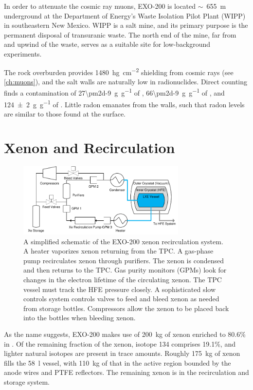 \documentclass[herrin-thesis.tex]{subfiles}
\begin{document}
In order to attenuate the cosmic ray muons, EXO-200 is located \(\sim\)~\SI{655}{\m} underground at the Department of Energy's Waste Isolation Pilot Plant (WIPP) in southeastern New Mexico. WIPP is a salt mine, and its primary purpose is the permanent disposal of transuranic waste. The north end of the mine, far from and upwind of the waste, serves as a suitable site for low-background experiments.

The rock overburden provides \SI{1480}{\hecto\g\per\square\cm} shielding from cosmic rays (see \cref{ch:muons}), and the salt walls are naturally low in radionuclides. Direct counting finds a contamination of \SI[per-mode=symbol]{27\pm2d-9}{\g\per\g} of , \SI[per-mode=symbol]{66\pm2d-9}{\g\per\g} of , and \SI[per-mode=symbol]{124\pm2}{\g\per\g} of \cite{Auger:2012dq}. Little radon emanates from the walls, such that radon levels are similar to those found at the surface.

\section{Xenon and Recirculation}

\begin{figure}
\centering
\includegraphics[width=0.75\textwidth]{./figures/detector_simplified_xe.pdf}
\caption[The EXO-200 xenon recirculation system]{A simplified schematic of the EXO-200 xenon recirculation system. A heater vaporizes xenon returning from the TPC. A gas-phase pump recirculates xenon through purifiers. The xenon is condensed and then returns to the TPC. Gas purity monitors (GPMs) look for changes in the electron lifetime of the circulating xenon. The TPC vessel must track the HFE pressure closely. A sophisticated slow controls system controls valves to feed and bleed xenon as needed from storage bottles. Compressors allow the xenon to be placed back into the bottles when bleeding xenon.}
\label{fig:detector_simplified_xe}
\end{figure}

As the name suggests, EXO-200 makes use of \SI{200}{\kg} of xenon enriched to 80.6\% in . Of the remaining fraction of the xenon, isotope 134 comprises 19.1\%, and lighter natural isotopes are present in trace amounts. Roughly \SI{175}{\kg} of xenon fills the \SI{58}{\l} vessel, with \SI{110}{\kg} of that in the active region bounded by the anode wires and PTFE reflectors. The remaining xenon is in the recirculation and storage system.
\end{document}
